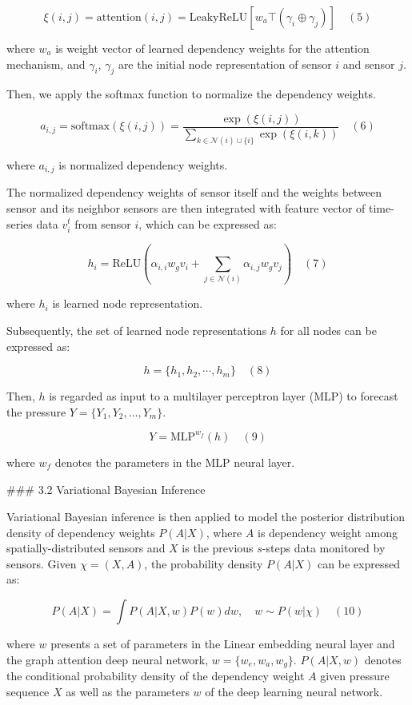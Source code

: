 $$
\xi(i,j) = \mathrm{attention}(i,j) = \mathrm{LeakyReLU}[w_a\top(\gamma_i \oplus \gamma_j)] \quad (5)
$$

where $𝑤_𝑎$ is weight vector of learned dependency weights for the attention mechanism, and $\gamma_𝑖$, $\gamma_𝑗$ are the initial node representation of sensor $i$ and sensor $j$.

Then, we apply the softmax function to normalize the dependency weights.

$$
a_{i,j} = \mathrm{softmax}(\xi(i,j)) = \frac{\exp(\xi(i,j))}{\sum_{k \in \mathcal{N}(i) \cup \{i\}}\exp(\xi(i,k))} \quad (6)
$$

where $a_{i,j}$ is normalized dependency weights.

The normalized dependency weights of sensor itself and the weights between sensor and its neighbor sensors are then integrated with feature vector of time-series data $v_i^t$ from sensor $i$, which can be expressed as:

$$
h_i = \mathrm{ReLU} (\alpha_{i,i}w_gv_i + \sum_{j \in \mathcal{N}(i)}\alpha_{i,j}w_gv_j) \quad (7)
$$

where $ℎ_𝑖$ is learned node representation.

Subsequently, the set of learned node representations $ℎ$ for all nodes can be expressed as:

$$
h = \{h_1,h_2,\cdots,h_m\} \quad (8)
$$

Then, $ℎ$ is regarded as input to a multilayer perceptron layer (MLP) to forecast the pressure $𝑌 = \{𝑌_1,𝑌_2,…,𝑌_𝑚\}$.

$$
Y = \mathrm{MLP}^{w_f}(h) \quad (9)
$$

where $𝑤_𝑓$ denotes the parameters in the MLP neural layer.

### 3.2 Variational Bayesian Inference

Variational Bayesian inference is then applied to model the posterior distribution density of dependency weights $P(A|X)$, where $A$ is dependency weight among spatially-distributed sensors and $X$ is the previous $s$-steps data monitored by sensors. Given $\chi = (X,A)$, the probability density $P(A|X)$ can be expressed as:

$$
P(A|X) = \int P(A|X,w)P(w)dw, \quad w \sim P(w|\chi) \quad (10)
$$

where $w$ presents a set of parameters in the Linear embedding neural layer and the graph attention deep neural network, $w = \{w_e,w_a,w_g\}$. $P(A|X,w)$ denotes the conditional probability density of the dependency weight $A$ given pressure sequence $X$ as well as the parameters $w$ of the deep learning neural network.

